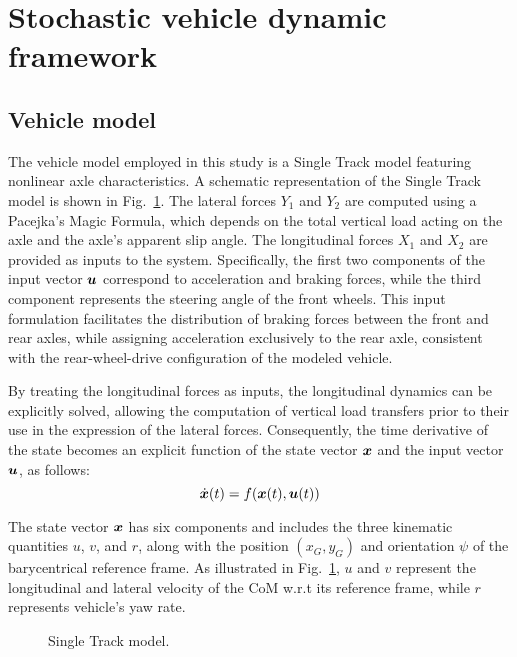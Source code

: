 \section{Stochastic vehicle dynamic framework}
\label{sec:svdf}

\subsection{Vehicle model}
\label{sec:vehicle_model}
The vehicle model employed in this study is a Single Track model featuring nonlinear axle characteristics. A schematic representation of the Single Track model is shown in Fig.~\ref{fig:vehicle_model}. The lateral forces $Y_1$ and $Y_2$ are computed using a Pacejka's Magic Formula, which depends on the total vertical load acting on the axle and the axle's apparent slip angle.
The longitudinal forces $X_1$ and $X_2$ are provided as inputs to the system. Specifically, the first two components of the input vector $\boldsymbol{u}$ correspond to acceleration and braking forces, while the third component represents the steering angle of the front wheels. This input formulation facilitates the distribution of braking forces between the front and rear axles, while assigning acceleration exclusively to the rear axle, consistent with the rear-wheel-drive configuration of the modeled vehicle.

By treating the longitudinal forces as inputs, the longitudinal dynamics can be explicitly solved, allowing the computation of vertical load transfers prior to their use in the expression of the lateral forces. Consequently, the time derivative of the state becomes an explicit function of the state vector $\boldsymbol{x}$ and the input vector $\boldsymbol{u}$, as follows:
\begin{equation}
	\dot{\boldsymbol{x}}(t) = f(\boldsymbol{x}(t), \boldsymbol{u}(t))
\end{equation}

The state vector $\boldsymbol{x}$ has six components and includes the three kinematic quantities $u$, $v$, and $r$, along with the position $\left(x_G, y_G\right)$ and orientation $\psi$ of the barycentrical reference frame. As illustrated in Fig.~\ref{fig:vehicle_model}, $u$ and $v$ represent the longitudinal and lateral velocity of the CoM w.r.t its reference frame, while $r$ represents vehicle's yaw rate.

\begin{figure}
	\centering
	
	\caption{Single Track model.}
	\label{fig:vehicle_model}
\end{figure}

